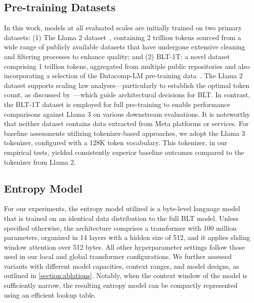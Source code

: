 \subsection{Pre-training Datasets} In this work, models at all evaluated scales are initially trained on two primary datasets: (1) The Llama 2 dataset~\citep{touvron2023llama}, containing 2 trillion tokens sourced from a wide range of publicly available datasets that have undergone extensive cleaning and filtering processes to enhance quality; and (2) {\textsc BLT}-1T: a novel dataset comprising 1 trillion tokens, aggregated from multiple public repositories and also incorporating a selection of the Datacomp-LM pre-training data~\citep{li2024datacomp}. The Llama 2 dataset supports scaling law analyses—particularly to establish the optimal token count, as discussed by~\cite{dubey2024llama}—which guide architectural decisions for {\textsc BLT}. In contrast, the {\textsc BLT}-1T dataset is employed for full pre-training to enable performance comparisons against Llama 3 on various downstream evaluations. It is noteworthy that neither dataset contains data extracted from Meta platforms or services. For baseline assessments utilizing tokenizer-based approaches, we adopt the Llama 3 tokenizer, configured with a 128K token vocabulary. This tokenizer, in our empirical tests, yielded consistently superior baseline outcomes compared to the tokenizer from Llama 2.

\subsection{Entropy Model} For our experiments, the entropy model utilized is a byte-level language model that is trained on an identical data distribution to the full {\textsc BLT} model. Unless specified otherwise, the architecture comprises a transformer with 100 million parameters, organized in 14 layers with a hidden size of 512, and it applies sliding window attention over 512 bytes. All other hyperparameter settings follow those used in our local and global transformer configurations. We further assessed variants with different model capacities, context ranges, and model designs, as outlined in \autoref{section:ablations}. Notably, when the context window of the model is sufficiently narrow, the resulting entropy model can be compactly represented using an efficient lookup table.

